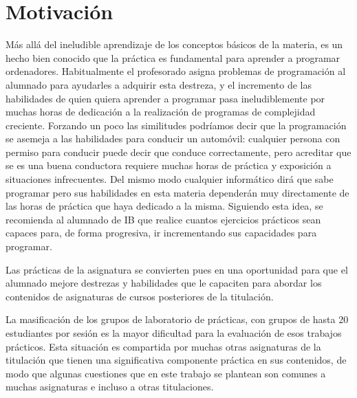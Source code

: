 \documentclass[twocolumn,twoside,a4paper, 10pt]{article}
\begin{document}
\section{Motivación}
Más allá del ineludible aprendizaje de los conceptos básicos de la materia, 
es un hecho bien conocido que la práctica es fundamental para aprender a programar ordenadores. 
Habitualmente el profesorado asigna problemas de programación al alumnado para ayudarles a adquirir esta 
destreza, y el incremento de las habilidades de quien quiera aprender a programar pasa ineludiblemente por 
muchas horas de dedicación a la realización de programas de complejidad creciente.
Forzando un poco las similitudes podríamos decir que la programación se asemeja a las habilidades para
conducir un automóvil: cualquier persona con permiso para conducir puede decir que conduce correctamente, pero
acreditar que se es una buena conductora requiere muchas horas de práctica y exposición a situaciones
infrecuentes.
Del mismo modo cualquier informático dirá que sabe programar pero sus habilidades en esta materia dependerán
muy directamente de las horas de práctica que haya dedicado a la misma.
Siguiendo esta idea, se recomienda al alumnado de IB que realice cuantos ejercicios prácticos
sean capaces para, de forma progresiva, ir incrementando sus capacidades para programar.

Las prácticas de la asignatura se convierten pues en una oportunidad para que el alumnado mejore destrezas y
habilidades que le capaciten para abordar los contenidos de asignaturas de cursos posteriores de la
titulación.

La masificación de los grupos de laboratorio de prácticas, con grupos de hasta 20 estudiantes por sesión es
la mayor dificultad para la evaluación de esos trabajos prácticos.
Esta situación es compartida por muchas otras asignaturas de la titulación que tienen una significativa
componente práctica en sus contenidos, de modo que algunas cuestiones que en este trabajo se plantean
son comunes a muchas asignaturas e incluso a otras titulaciones.
\end{document}
